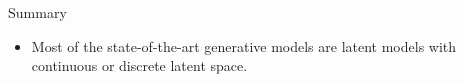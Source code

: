 \begin{frame}{Summary}
	\begin{itemize}
		\item Most of the state-of-the-art generative models are latent models with continuous or discrete latent space.
	\end{itemize}
\end{frame}
 